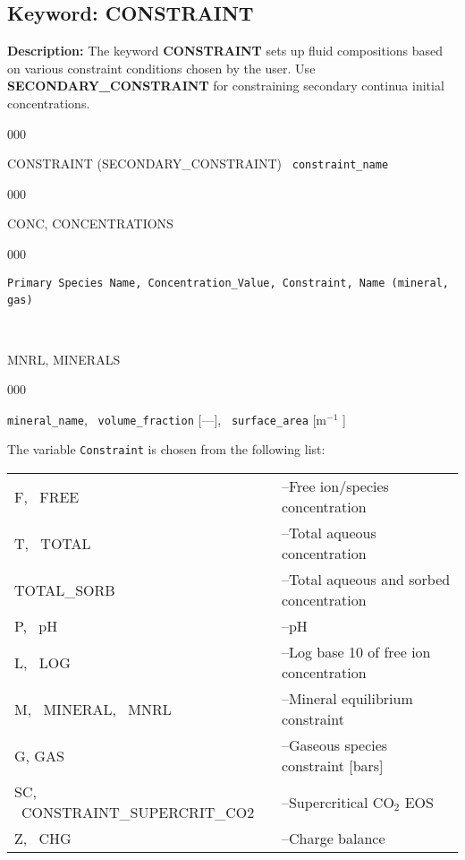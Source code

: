 \newpage
\protect\hypertarget{target_constraint}{}

\subsection{Keyword: CONSTRAINT}

\noindent
{\bf Description:}
The keyword {\bf CONSTRAINT} sets up fluid compositions based on various constraint conditions chosen by the user. Use {\bf SECONDARY\_CONSTRAINT} for constraining secondary continua initial concentrations.

\begin{deflist}{000}
\item [CONSTRAINT (SECONDARY\_CONSTRAINT)] \ {\tt constraint\_name}
\begin{deflist}{000}
\item[CONC, CONCENTRATIONS] ~
\begin{deflist}{000}
\item[{\footnotesize\tt Primary Species Name, Concentration\_Value, Constraint, Name (mineral, gas)}] ~
\end{deflist}
\item[\keyend] ~


\item[MNRL, MINERALS] ~

\begin{deflist}{000}
\item[{\tt mineral\_name}, \ {\tt volume\_fraction} {[---]}, \ {\tt surface\_area} [m$^{-1}$]]
\end{deflist}
\item[\keyend]
\end{deflist}
\item[\keyend]
\end{deflist}


The variable {\tt Constraint} is chosen from the following list:


\begin{tabular}{ll}
F, \ FREE & --Free ion/species concentration\\
T, \ TOTAL & --Total aqueous concentration\\
TOTAL\_SORB & --Total aqueous and sorbed concentration\\
P, \ pH & --pH\\
L, \ LOG & --Log base 10 of free ion concentration\\
M, \ MINERAL, \ MNRL & --Mineral equilibrium constraint\\
G, GAS & --Gaseous species constraint [bars]\\
SC, \ CONSTRAINT\_SUPERCRIT\_CO2 & --Supercritical CO$_2$ EOS\\
Z, \ CHG & --Charge balance
\end{tabular}


